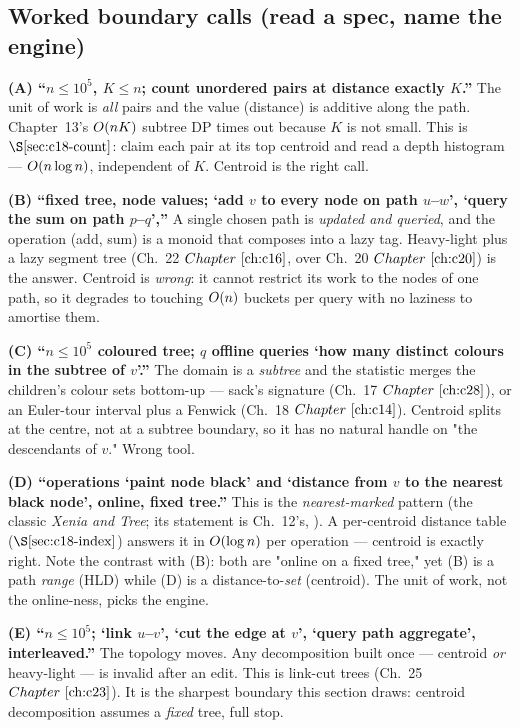 \subsection{Worked boundary calls (read a spec, name the engine)}

\begin{comparisonbox}
\textbf{(A) ``\(n\le10^5\), \(K\le n\); count unordered pairs at distance exactly \(K\).''}
The unit of work is \emph{all} pairs and the value (distance) is additive along the path.
Chapter~13's \(O(nK)\) subtree DP times out because \(K\) is not small. This is
\(\secref{c18-count}\): claim each pair at its top centroid and read a depth histogram ---
\(O(n\log n)\), independent of \(K\). Centroid is the right call.

\textbf{(B) ``fixed tree, node values; `add \(v\) to every node on path \(u\)--\(w\)', `query the sum on path \(p\)--\(q\)','' }
A single chosen path is \emph{updated and queried}, and the operation (add, sum) is a
monoid that composes into a lazy tag. Heavy-light plus a lazy segment tree
(Ch.~22 \(\chref{c16}\), over Ch.~20 \(\chref{c20}\)) is the answer. Centroid is
\emph{wrong}: it cannot restrict its work to the nodes of one path, so it degrades to
touching \(O(n)\) buckets per query with no laziness to amortise them.

\textbf{(C) ``\(n\le10^5\) coloured tree; \(q\) offline queries `how many distinct colours in the subtree of \(v\)'.''}
The domain is a \emph{subtree} and the statistic merges the children's colour sets
bottom-up --- sack's signature (Ch.~17 \(\chref{c28}\)), or an Euler-tour interval plus a
Fenwick (Ch.~18 \(\chref{c14}\)). Centroid splits at the centre, not at a subtree
boundary, so it has no natural handle on "the descendants of \(v\)." Wrong tool.

\textbf{(D) ``operations `paint node black' and `distance from \(v\) to the nearest black node', online, fixed tree.''}
This is the \emph{nearest-marked} pattern (the classic \emph{Xenia and Tree}; its
statement is Ch.~12's, ). A per-centroid distance table (\(\secref{c18-index}\))
answers it in \(O(\log n)\) per operation --- centroid is exactly right. Note the
contrast with (B): both are "online on a fixed tree," yet (B) is a path \emph{range} (HLD)
while (D) is a distance-to-\emph{set} (centroid). The unit of work, not the online-ness,
picks the engine.

\textbf{(E) ``\(n\le10^5\); `link \(u\)--\(v\)', `cut the edge at \(v\)', `query path aggregate', interleaved.''}
The topology moves. Any decomposition built once --- centroid \emph{or} heavy-light --- is
invalid after an edit. This is link-cut trees (Ch.~25 \(\chref{c23}\)). It is the sharpest
boundary this section draws: centroid decomposition assumes a \emph{fixed} tree, full stop.
\end{comparisonbox}

